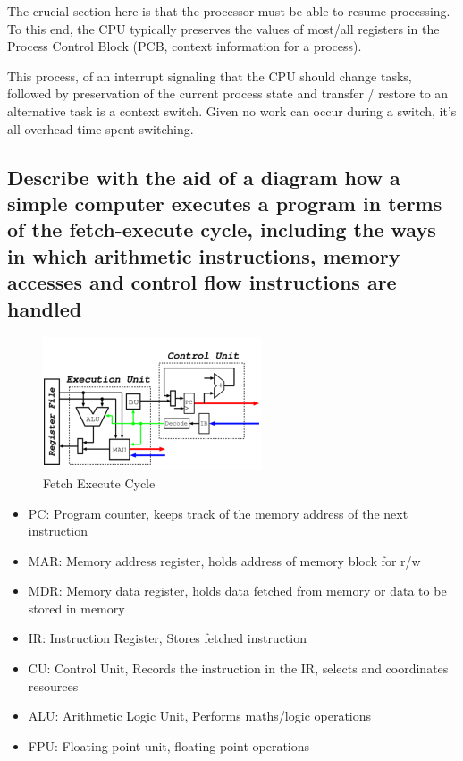 \documentclass[]{article}
\begin{document}
            The crucial section here is that the processor must be able to resume processing. To this end, the CPU typically preserves the values of most/all registers in the Process Control Block (PCB, context information for a process).

            This process, of an interrupt signaling that the CPU should change tasks, followed by preservation of the current process state and transfer / restore to an alternative task is a context switch. Given no work can occur during a switch, it's all overhead time spent switching.
    \subsection{Describe with the aid of a diagram how a simple computer executes a program in terms of the fetch-execute cycle, including the ways in which arithmetic instructions, memory accesses and control flow instructions are handled}
        \begin{figure}[ht]
            \centering
            \includegraphics[width=0.5\linewidth]{"media/fetchexecute"}
            \caption{Fetch Execute Cycle}
        \end{figure}
        \begin{itemize}
            \item PC: Program counter, keeps track of the memory address of the next instruction
            \item MAR: Memory address register, holds address of memory block for r/w
            \item MDR: Memory data register, holds data fetched from memory or data to be stored in memory
            \item IR: Instruction Register, Stores fetched instruction
            \item CU: Control Unit, Records the instruction in the IR, selects and coordinates resources
            \item ALU: Arithmetic Logic Unit, Performs maths/logic operations
            \item FPU: Floating point unit, floating point operations
        \end{itemize}
\end{document}
